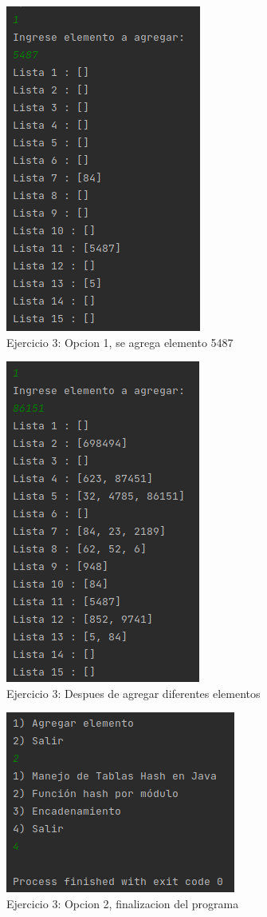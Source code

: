 \documentclass{article}
\begin{document}
			\begin{figure}[H]
				\centering
				\includegraphics{images/e34.png}
				\caption*{Ejercicio 3: Opcion 1, se agrega elemento 5487}
			\end{figure}
			
			\begin{figure}[H]
				\centering
				\includegraphics{images/e35.png}
				\caption*{Ejercicio 3: Despues de agregar diferentes elementos}
			\end{figure}
			
			\begin{figure}[H]
				\centering
				\includegraphics{images/e36.png}
				\caption*{Ejercicio 3: Opcion 2, finalizacion del programa}
			\end{figure}
			
\end{document}
